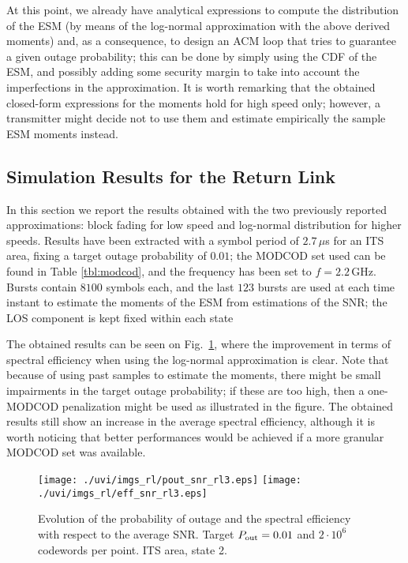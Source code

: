 \documentclass[journal,onecolumn,10pt,a4paper]{IEEEtran}
\begin{document}
At this point, we already have analytical expressions to compute the distribution of the ESM (by means of the log-normal approximation with the above derived moments) and, as a consequence, to design an ACM loop that tries to guarantee a given outage probability; this can be done by simply using the CDF of the ESM, and possibly adding some security margin to take into account the imperfections in the approximation. It is worth remarking that the obtained closed-form expressions for the moments hold for high speed only; however, a transmitter might decide not to use them and estimate empirically the sample ESM moments instead.
 
\subsection{Simulation Results for the Return Link}
In this section we report the results obtained with the two previously reported approximations: block fading for low speed and log-normal distribution for higher speeds. Results have been extracted with a symbol period of $2.7\,\mu$s for an ITS area, fixing a target outage probability of $0.01$; the MODCOD set used can be found in Table \ref{tbl:modcod}, and the frequency has been set to $f = 2.2$\,GHz. Bursts contain $8100$ symbols each, and the last $123$ bursts are used at each time instant to estimate the moments of the ESM from estimations of the SNR; the LOS component is kept fixed within each state

The obtained results can be seen on Fig.~\ref{fig:pout_snr_rl1}, where the improvement in terms of spectral efficiency when using the log-normal approximation is clear. Note that because of using past samples to estimate the moments, there might be small impairments in the target outage probability; if these are too high, then a one-MODCOD penalization might be used as illustrated in the figure. The obtained results still show an increase in the average spectral efficiency, although it is worth noticing that better performances would be achieved if a more granular MODCOD set was available.

\begin{figure}
\hspace{-.5cm}
 \texttt{[image: ./uvi/imgs\_rl/pout\_snr\_rl3.eps]}\hspace*{-.9cm}
\texttt{[image: ./uvi/imgs\_rl/eff\_snr\_rl3.eps]}
\caption{Evolution of the probability of outage and the spectral efficiency with respect to the average SNR. Target $P_\textnormal{out}=0.01$ and $2\cdot10^6$ codewords per point. ITS area, state 2.}
 \label{fig:pout_snr_rl1}
\end{figure}
\end{document}
